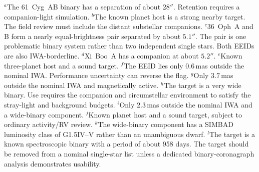 \begin{table}[tp]
\label{tab:hztargets}
\vspace{2pt}
\begin{minipage}{0.98\textwidth}
\footnotesize
$^{a}$The 61~Cyg~AB binary has a separation of about $28''$. Retention requires a companion-light simulation.
$^{b}$The known planet host is a strong nearby target. The field review must include the distant substellar companions.
$^{c}$36~Oph~A and B form a nearly equal-brightness pair separated by about $5.1''$. The pair is one problematic binary system rather than two independent single stars. Both EEIDs are also IWA-borderline.
$^{d}$Xi~Boo~A has a companion at about $5.2''$.
$^{e}$Known three-planet host and a sound target.
$^{f}$The EEID lies only $0.6$\,mas outside the nominal IWA. Performance uncertainty can reverse the flag.
$^{g}$Only $3.7$\,mas outside the nominal IWA and magnetically active.
$^{h}$The target is a very wide binary. Use requires the companion and circumstellar environment to satisfy the stray-light and background budgets.
$^{i}$Only $2.3$\,mas outside the nominal IWA and a wide-binary component.
$^{j}$Known planet host and a sound target, subject to ordinary activity/RV review.
$^{k}$The wide-binary component has a SIMBAD luminosity class of G1.5IV--V rather than an unambiguous dwarf.
$^{l}$The target is a known spectroscopic binary with a period of about 958 days. The target should be removed from a nominal single-star list unless a dedicated binary-coronagraph analysis demonstrates usability.
\end{minipage}
\end{table}
